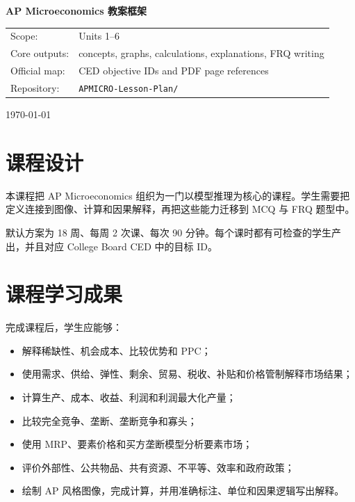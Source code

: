 \documentclass[11pt,a4paper]{ctexart}
\newcommand{\codepath}[1]{\texttt{\small #1}}
\begin{document}
\begin{titlepage}\centering\vspace*{2cm}
{\Huge\bfseries AP Microeconomics 教案框架\par}\vspace{0.5cm}{\LARGE 36 课时课程框架与课时设计\par}
\vspace{1cm}{\large 18 weeks \textperiodcentered 2 meetings per week \textperiodcentered 90 minutes per meeting\par}
\vspace{0.5cm}{\large 中文版（保留 AP 专业术语与英文缩写）\par}\vfill
\begin{tabular}{ll}Scope: & Units 1--6\\Core outputs: & concepts, graphs, calculations, explanations, FRQ writing\\Official map: & CED objective IDs and PDF page references\\Repository: & \codepath{APMICRO-Lesson-Plan/}\\\end{tabular}
\vfill{\large \today\par}\end{titlepage}
\tableofcontents\newpage
\section{课程设计}
本课程把 AP Microeconomics 组织为一门以模型推理为核心的课程。学生需要把定义连接到图像、计算和因果解释，再把这些能力迁移到 MCQ 与 FRQ 题型中。

默认方案为 18 周、每周 2 次课、每次 90 分钟。每个课时都有可检查的学生产出，并且对应 College Board CED 中的目标 ID。

\section{课程学习成果}
完成课程后，学生应能够：
\begin{itemize}[leftmargin=2em]
\item 解释稀缺性、机会成本、比较优势和 PPC；
\item 使用需求、供给、弹性、剩余、贸易、税收、补贴和价格管制解释市场结果；
\item 计算生产、成本、收益、利润和利润最大化产量；
\item 比较完全竞争、垄断、垄断竞争和寡头；
\item 使用 MRP、要素价格和买方垄断模型分析要素市场；
\item 评价外部性、公共物品、共有资源、不平等、效率和政府政策；
\item 绘制 AP 风格图像，完成计算，并用准确标注、单位和因果逻辑写出解释。
\end{itemize}
\end{document}
